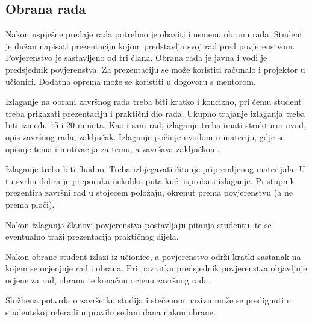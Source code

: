 \subsection{Obrana rada}
Nakon uspješne predaje rada potrebno je obaviti i usmenu obranu rada. Student je dužan napisati prezentaciju kojom predstavlja svoj rad pred povjerenstvom. Povjerenstvo je sastavljeno od tri člana. Obrana rada je javna i vodi je predsjednik povjerenstva. Za prezentaciju se može koristiti računalo i projektor u učionici. Dodatna oprema može se koristiti u dogovoru s mentorom.

Izlaganje na obrani završnog rada treba biti kratko i koncizno, pri čemu student treba prikazati prezentaciju i praktični dio rada. Ukupno trajanje izlaganja treba biti između 15 i 20 minuta. Kao i sam rad, izlaganje treba imati strukturu: uvod, opis završnog rada, zaključak. Izlaganje počinje uvodom u materiju, gdje se opisuje tema i motivacija za temu, a završava zaključkom.

Izlaganje treba biti fluidno. Treba izbjegavati čitanje pripremljenog materijala. U tu svrhu dobra je preporuka nekoliko puta kući isprobati izlaganje. Pristupnik prezentira završni rad u stojećem položaju, okrenut prema povjerenstvu (a ne prema ploči).

Nakon izlaganja članovi povjerenstva postavljaju pitanja studentu, te se eventualno traži prezentacija praktičnog dijela. 

Nakon obrane student izlazi iz učionice, a povjerenstvo održi kratki sastanak na kojem se ocjenjuje rad i obrana. Pri povratku predsjednik povjerenstva objavljuje ocjene za rad, obranu te konačnu ocjenu završnog rada. 

Službena potvrda o završetku studija i stečenom nazivu može se predignuti u studentskoj referadi u pravilu sedam dana nakon obrane.